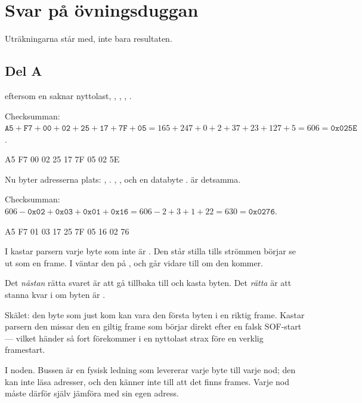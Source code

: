 \chapter{Svar på övningsduggan}
\label{ch:ovningssvar}

Uträkningarna står med, inte bara resultaten.

\section*{Del A}

  eftersom en  saknar nyttolast, ,
, , .

Checksumman: $\mathtt{A5} + \mathtt{F7} + \mathtt{00} + \mathtt{02} + \mathtt{25} + \mathtt{17} +
\mathtt{7F} + \mathtt{05} = 165 + 247 + 0 + 2 + 37 + 23 + 127 + 5 = 606 = \mathtt{0x025E}$.

\begin{console}
A5 F7 00 02 25 17 7F 05 02 5E
\end{console}

 Nu byter adresserna plats: , . ,
, och en databyte .  är detsamma.

Checksumman: $606 - \mathtt{0x02} + \mathtt{0x03} + \mathtt{0x01} + \mathtt{0x16} =
606 - 2 + 3 + 1 + 22 = 630 = \mathtt{0x0276}$.

\begin{console}
A5 F7 01 03 17 25 7F 05 16 02 76
\end{console}

 I  kastar parsern varje byte som inte är . Den står stilla
tills strömmen börjar se ut som en frame. I  väntar den på , och går
vidare till  om den kommer.

 Det \emph{nästan} rätta svaret är att gå tillbaka till  och kasta byten.
Det \emph{rätta} är att stanna kvar i  om byten är .

Skälet: den byte som just kom kan vara den första byten i en riktig frame. Kastar parsern den
missar den en giltig frame som börjar direkt efter en falsk SOF-start --- vilket händer så fort
 förekommer i en nyttolast strax före en verklig framestart.

 I noden. Bussen är en fysisk ledning som levererar varje byte till varje nod; den kan inte
läsa adresser, och den känner inte till att det finns frames. Varje nod måste därför själv jämföra
 med sin egen adress.

